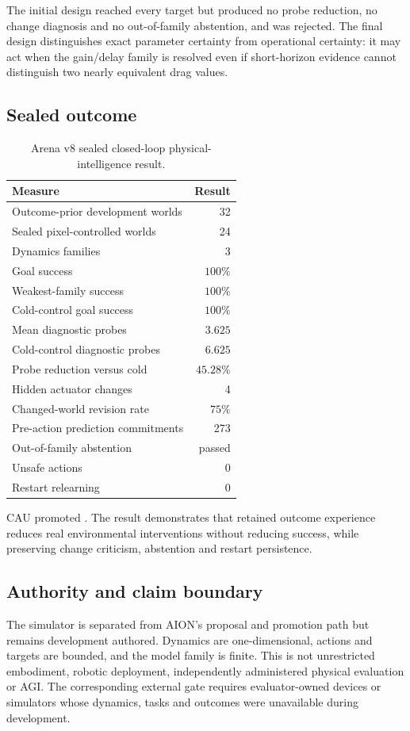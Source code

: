 The initial design reached every target but produced no probe reduction, no
change diagnosis and no out-of-family abstention, and was rejected.  The final
design distinguishes exact parameter certainty from operational certainty: it
may act when the gain/delay family is resolved even if short-horizon evidence
cannot distinguish two nearly equivalent drag values.

\subsection{Sealed outcome}

\begin{table}[ht]
\centering
\small
\begin{tabular}{@{}lr@{}}
\hline
Measure & Result \\
\hline
Outcome-prior development worlds & 32 \\
Sealed pixel-controlled worlds & 24 \\
Dynamics families & 3 \\
Goal success & $100\%$ \\
Weakest-family success & $100\%$ \\
Cold-control goal success & $100\%$ \\
Mean diagnostic probes & $3.625$ \\
Cold-control diagnostic probes & $6.625$ \\
Probe reduction versus cold & $45.28\%$ \\
Hidden actuator changes & 4 \\
Changed-world revision rate & $75\%$ \\
Pre-action prediction commitments & 273 \\
Out-of-family abstention & passed \\
Unsafe actions & 0 \\
Restart relearning & 0 \\
\hline
\end{tabular}
\caption{Arena v8 sealed closed-loop physical-intelligence result.}
\end{table}

CAU promoted
.
The result demonstrates that retained outcome experience reduces real
environmental interventions without reducing success, while preserving
change criticism, abstention and restart persistence.

\subsection{Authority and claim boundary}

The simulator is separated from AION's proposal and promotion path but remains
development authored.  Dynamics are one-dimensional, actions and targets are
bounded, and the model family is finite.  This is not unrestricted embodiment,
robotic deployment, independently administered physical evaluation or AGI.
The corresponding external gate requires evaluator-owned devices or simulators
whose dynamics, tasks and outcomes were unavailable during development.

